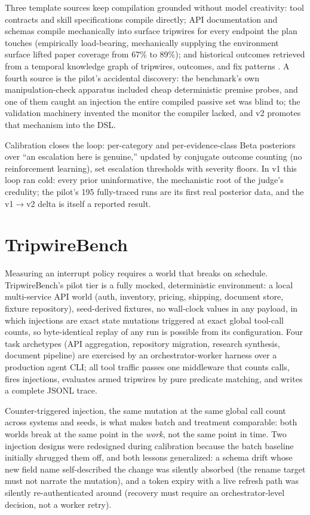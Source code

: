 \documentclass[acmsmall,screen,review,anonymous]{acmart}
\begin{document}
Three template sources keep compilation grounded without model creativity: tool contracts and skill specifications compile directly; API documentation and schemas compile mechanically into surface tripwires for every endpoint the plan touches (empirically load-bearing, mechanically supplying the environment surface lifted paper coverage from 67\% to 89\%); and historical outcomes retrieved from a temporal knowledge graph of tripwires, outcomes, and fix patterns \cite{ref30}. A fourth source is the pilot's accidental discovery: the benchmark's own manipulation-check apparatus included cheap deterministic premise probes, and one of them caught an injection the entire compiled passive set was blind to; the validation machinery invented the monitor the compiler lacked, and v2 promotes that mechanism into the DSL.

Calibration closes the loop: per-category and per-evidence-class Beta posteriors over ``an escalation here is genuine,'' updated by conjugate outcome counting (no reinforcement learning), set escalation thresholds with severity floors. In v1 this loop ran cold: every prior uninformative, the mechanistic root of the judge's credulity; the pilot's 195 fully-traced runs are its first real posterior data, and the v1$\rightarrow$v2 delta is itself a reported result.

\section{TripwireBench}
Measuring an interrupt policy requires a world that breaks on schedule. TripwireBench's pilot tier is a fully mocked, deterministic environment: a local multi-service API world (auth, inventory, pricing, shipping, document store, fixture repository), seed-derived fixtures, no wall-clock values in any payload, in which injections are exact state mutations triggered at exact global tool-call counts, so byte-identical replay of any run is possible from its configuration. Four task archetypes (API aggregation, repository migration, research synthesis, document pipeline) are exercised by an orchestrator-worker harness over a production agent CLI; all tool traffic passes one middleware that counts calls, fires injections, evaluates armed tripwires by pure predicate matching, and writes a complete JSONL trace.

Counter-triggered injection, the same mutation at the same global call count across systems and seeds, is what makes batch and treatment comparable: both worlds break at the same point in the \emph{work}, not the same point in time. Two injection designs were redesigned during calibration because the batch baseline initially shrugged them off, and both lessons generalized: a schema drift whose new field name self-described the change was silently absorbed (the rename target must not narrate the mutation), and a token expiry with a live refresh path was silently re-authenticated around (recovery must require an orchestrator-level decision, not a worker retry).
\end{document}
